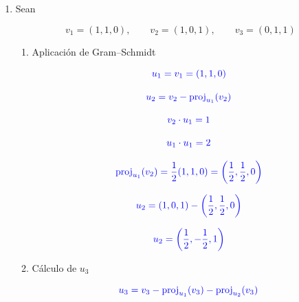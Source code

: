 \documentclass[12pt,letterpaper]{article}
\newcommand{\respuesta}[1]{
\[
\textcolor{blue}{#1}
\]
}
\begin{document}
\begin{enumerate}[label=\textbf{\arabic*.}]
\begin{enumerate}[label=\alph*)]
\item Cálculo de \(u_2\)

\respuesta{
u_2=(1,1,0)-(1,0,0)
}

\respuesta{
u_2=(0,1,0)
}

\item Verificación

\respuesta{
u_1\cdot u_2=(1)(0)+(0)(1)+(0)(0)=0
}

\item Base ortonormal

Como ambos vectores tienen norma 1:

\respuesta{
\left\{
(1,0,0),
(0,1,0)
\right\}
}

\end{enumerate}

\vspace{0.5cm}


\item Sean

\[
v_1=(1,1,0),
\qquad
v_2=(1,0,1),
\qquad
v_3=(0,1,1)
\]

\begin{enumerate}[label=\alph*)]

\item Aplicación de Gram--Schmidt

\respuesta{
u_1=v_1=(1,1,0)
}

\respuesta{
u_2=v_2-\operatorname{proj}_{u_1}(v_2)
}

\respuesta{
v_2\cdot u_1=1
}

\respuesta{
u_1\cdot u_1=2
}

\respuesta{
\operatorname{proj}_{u_1}(v_2)
=
\frac12(1,1,0)
=
\left(
\frac12,
\frac12,
0
\right)
}

\respuesta{
u_2=
\left(
1,0,1
\right)
-
\left(
\frac12,
\frac12,
0
\right)
}

\respuesta{
u_2=
\left(
\frac12,
-\frac12,
1
\right)
}

\item Cálculo de \(u_3\)

\respuesta{
u_3=
v_3
-
\operatorname{proj}_{u_1}(v_3)
-
\operatorname{proj}_{u_2}(v_3)
}


\end{enumerate}
\end{enumerate}
\end{document}
